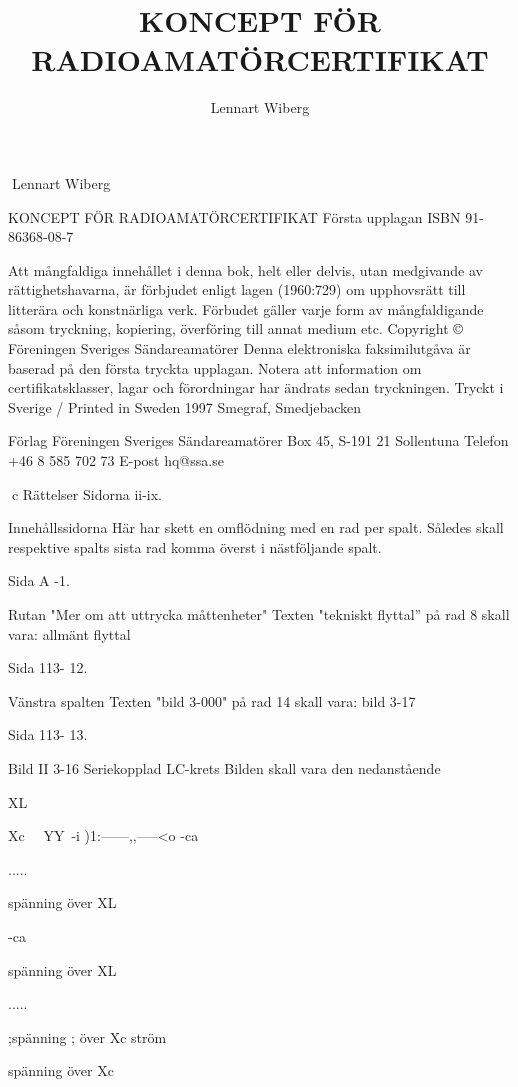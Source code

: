 \documentclass[a4paper,twoside,twocolumn,openright]{book}
\begin{document}
\frontmatter
\title{KONCEPT FÖR RADIOAMATÖRCERTIFIKAT}
\author{Lennart Wiberg}
\maketitle

Lennart Wiberg

KONCEPT FÖR RADIOAMATÖRCERTIFIKAT
Första upplagan
ISBN 91-86368-08-7

Att mångfaldiga innehållet i denna bok, helt eller delvis, utan medgivande av
rättighetshavarna, är förbjudet enligt lagen (1960:729) om upphovsrätt till
litterära och konstnärliga verk. Förbudet gäller varje form av mångfaldigande
såsom tryckning, kopiering, överföring till annat medium etc.
Copyright © Föreningen Sveriges Sändareamatörer
Denna elektroniska faksimilutgåva är baserad på den första tryckta
upplagan. Notera att information om certifikatsklasser, lagar och
förordningar har ändrats sedan tryckningen.
Tryckt i Sverige / Printed in Sweden 1997
Smegraf, Smedjebacken


Förlag
Föreningen Sveriges Sändareamatörer
Box 45, S-191 21 Sollentuna
Telefon +46 8 585 702 73
E-post hq@ssa.se


\tableofcontents

\mainmatter


c
Rättelser
Sidorna ii-ix.

Innehållssidorna
Här har skett en omflödning med en rad per spalt.
Således skall respektive spalts sista rad komma
överst i nästföljande spalt.

Sida A -1.

Rutan "Mer om att uttrycka måttenheter"
Texten "tekniskt flyttal'' på rad 8 skall vara: allmänt flyttal

Sida 113- 12.

Vänstra spalten
Texten "bild 3-000" på rad 14 skall vara: bild 3-17

Sida 113- 13.

Bild II 3-16 Seriekopplad LC-krets
Bilden skall vara den nedanstående

XL

Xc
~~YY~-i )1:------,,-----<o
-ca

.....

spänning
över XL

-ca

spänning över XL

.....

;spänning
; över Xc
ström

spänning över Xc
\end{document}

